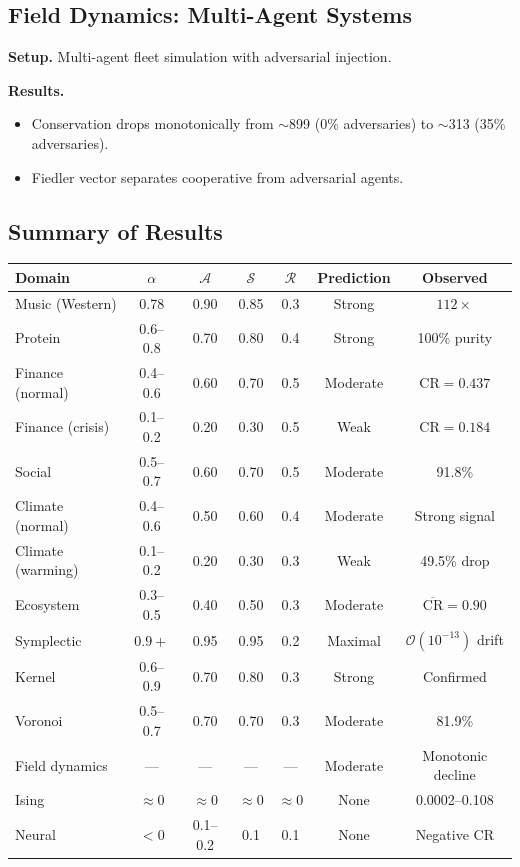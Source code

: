 \documentclass[12pt,letterpaper]{article}
\newcommand{\CR}{\mathrm{CR}}
\newcommand{\cA}{\mathcal{A}}
\newcommand{\cS}{\mathcal{S}}
\newcommand{\cR}{\mathcal{R}}
\newcommand{\cO}{\mathcal{O}}
\begin{document}
\subsection{Field Dynamics: Multi-Agent Systems}

\textbf{Setup.} Multi-agent fleet simulation with adversarial injection.

\textbf{Results.}
\begin{itemize}
  \item Conservation drops monotonically from $\sim$899 (0\% adversaries) to $\sim$313 (35\% adversaries).
  \item Fiedler vector separates cooperative from adversarial agents.
\end{itemize}

\subsection{Summary of Results}

\begin{center}
\small
\begin{tabular}{lcccccc}
  \toprule
  Domain & $\alpha$ & $\cA$ & $\cS$ & $\cR$ & Prediction & Observed \\
  \midrule
  Music (Western) & 0.78 & 0.90 & 0.85 & 0.3 & Strong & $112\times$ \\
  Protein & 0.6--0.8 & 0.70 & 0.80 & 0.4 & Strong & 100\% purity \\
  Finance (normal) & 0.4--0.6 & 0.60 & 0.70 & 0.5 & Moderate & $\CR = 0.437$ \\
  Finance (crisis) & 0.1--0.2 & 0.20 & 0.30 & 0.5 & Weak & $\CR = 0.184$ \\
  Social & 0.5--0.7 & 0.60 & 0.70 & 0.5 & Moderate & 91.8\% \\
  Climate (normal) & 0.4--0.6 & 0.50 & 0.60 & 0.4 & Moderate & Strong signal \\
  Climate (warming) & 0.1--0.2 & 0.20 & 0.30 & 0.3 & Weak & 49.5\% drop \\
  Ecosystem & 0.3--0.5 & 0.40 & 0.50 & 0.3 & Moderate & $\overline{\CR} = 0.90$ \\
  Symplectic & $0.9+$ & 0.95 & 0.95 & 0.2 & Maximal & $\cO(10^{-13})$ drift \\
  Kernel & 0.6--0.9 & 0.70 & 0.80 & 0.3 & Strong & Confirmed \\
  Voronoi & 0.5--0.7 & 0.70 & 0.70 & 0.3 & Moderate & 81.9\% \\
  Field dynamics & --- & --- & --- & --- & Moderate & Monotonic decline \\
  \midrule
  Ising & $\approx 0$ & $\approx 0$ & $\approx 0$ & $\approx 0$ & None & 0.0002--0.108 \\
  Neural & $<0$ & 0.1--0.2 & 0.1 & 0.1 & None & Negative $\CR$ \\
  \bottomrule
\end{tabular}
\end{center}
\end{document}
